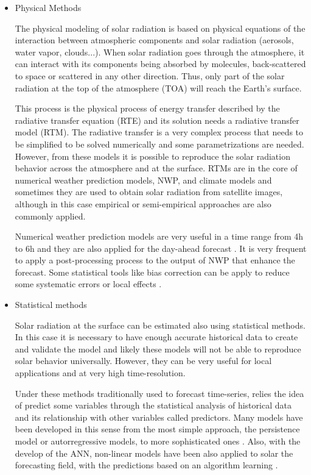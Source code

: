 \begin{itemize}
\item{Physical Methods}

The physical modeling of solar radiation is based on physical equations of the interaction between atmospheric components and solar radiation (aerosols, water vapor, clouds...). When solar radiation goes through the atmosphere, it can interact with its components being absorbed by molecules, back-scattered to space or scattered in any other direction. Thus, only part of the solar radiation at the top of the atmosphere (TOA) will reach the Earth's surface.

This process is the physical process of energy transfer described by the radiative transfer equation (RTE) and its solution needs a radiative transfer model (RTM). The radiative transfer is a very complex process that needs to be simplified to be solved numerically and some parametrizations are needed. However, from these models it is possible to reproduce the solar radiation behavior across the atmosphere and at the surface. RTMs are in the core of numerical weather prediction models, NWP, and climate models and sometimes they are used to obtain solar radiation from satellite images, although in this case empirical or semi-empirical approaches are also commonly applied.

Numerical weather prediction models are very useful in a time range from 4h to 6h and they are also applied for the day-ahead forecast \cite*{Perez2010}. It is very frequent to apply a post-processing process to the output of NWP that enhance the forecast. Some statistical tools like bias correction can be apply to reduce some systematic errors or local effects \cite*{Diagne2013}.


\item{Statistical methods}

Solar radiation at the surface can be estimated also using statistical methods. In this case it is necessary to have enough accurate historical data to create and validate the model and likely these models will not be able to reproduce solar behavior universally. However, they can be very useful for local applications and at very high time-resolution.

Under these methods traditionally used to forecast time-series, relies the idea of predict some variables through the statistical analysis of historical data and its relationship with other variables called predictors. Many models have been developed in this sense from the most simple approach, the persistence model or autorregressive models, to more sophisticated ones \cite*{Reikard2009, bacher2009, Inman2013}. Also, with the develop of the ANN, non-linear models have been also applied to solar the forecasting field, with the predictions based on an algorithm learning \cite{Mellit2008}. 
 

\end{itemize}
